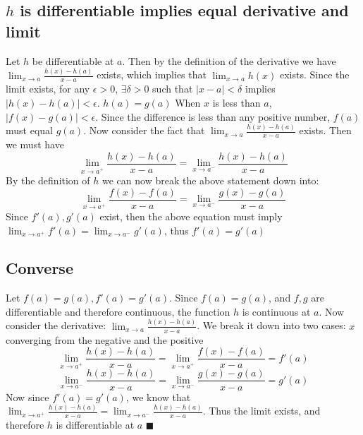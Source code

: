 \documentclass[12pt]{article}
\begin{document}
\subsection{$h$ is differentiable implies equal derivative and limit}
Let $h$ be differentiable at $a$. Then by the definition of the derivative we have $\lim_{x \to a} \frac{h(x)-h(a)}{x-a}$ exists, which implies that $\lim_{x \to a} h(x)$ exists.
Since the limit exists, for any $\epsilon > 0$, $\exists \delta > 0$ such that $|x-a|<\delta$ implies $|h(x)-h(a)|<\epsilon$. $h(a)=g(a)$ When $x$ is less than $a$, $|f(x)-g(a)|<\epsilon$. Since the difference is less than any positive number, $f(a)$ must equal $g(a)$.
\newline
Now consider the fact that  $\lim_{x \to a} \frac{h(x)-h(a)}{x-a}$ exists. Then we must have
$$\lim_{x \to a^+} \frac{h(x)-h(a)}{x-a} = \lim_{x \to a^-} \frac{h(x)-h(a)}{x-a}$$
By the definition of $h$ we can now break the above statement down into:
$$\lim_{x \to a^+} \frac{f(x)-f(a)}{x-a} = \lim_{x \to a^-} \frac{g(x)-g(a)}{x-a}$$
Since $f'(a), g'(a)$ exist, then the above equation must imply $\lim_{x \to a^+} f'(a) = \lim_{x \to a^-} g'(a)$, thus $f'(a)=g'(a)$


\subsection{Converse}
Let $f(a)=g(a), f'(a)=g'(a)$. Since $f(a)=g(a)$, and $f,g$ are differentiable and therefore continuous, the function $h$ is continuous at $a$.
Now consider the derivative: $\lim_{x \to a} \frac{h(x)-h(a)}{x-a}$.
\newline
We break it down into two cases: $x$ converging from the negative and the positive
$$\lim_{x \to a^+} \frac{h(x)-h(a)}{x-a} = \lim_{x \to a^+} \frac{f(x)-f(a)}{x-a} = f'(a)$$
$$\lim_{x \to a^-} \frac{h(x)-h(a)}{x-a} = \lim_{x \to a^-} \frac{g(x)-g(a)}{x-a} = g'(a)$$
Now since $f'(a)=g'(a)$, we know that $\lim_{x \to a^+} \frac{h(x)-h(a)}{x-a} = \lim_{x \to a^-} \frac{h(x)-h(a)}{x-a}$.
Thus the limit exists, and therefore $h$ is differentiable at $a$
\newline
$\blacksquare$
\end{document}
